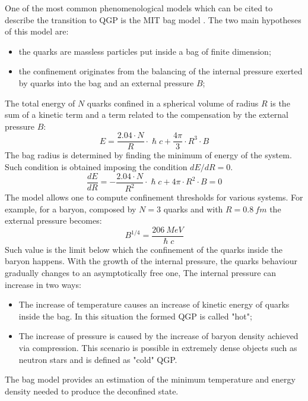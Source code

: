 One of the most common phenomenological models which can be cited to describe the transition to QGP is the MIT bag model \cite{PhysRevD.9.3471,PhysRevD.10.2599}.
The two main hypotheses of this model are:
\begin{itemize}
    \item the quarks are massless particles put inside a bag of finite dimension;
    \item the confinement originates from the balancing of the internal pressure exerted by quarks into the bag and an external pressure $B$;
\end{itemize}
The total energy of $N$ quarks confined in a spherical volume of radius $R$ is the sum of a kinetic term and a term related to the compensation by the external pressure $B$:
\begin{equation}
    E=\frac{2.04\cdot N}{R}\cdot \hslash c + \frac{4\pi}{3}\cdot R^3\cdot B
\end{equation}
The bag radius is determined by finding the minimum of energy of the system.
Such condition is obtained imposing the condition $dE/dR=0$.
\begin{equation}
\frac{dE}{dR}=-\frac{2.04\cdot N}{R^2}\cdot \hslash c + 4\pi\cdot R^2\cdot B = 0
\end{equation}
The model allows one to compute confinement thresholds for various systems.
For example, for a baryon, composed by $N=3$ quarks and with $R=0.8\ fm$ the external pressure becomes:
\begin{equation}
B^{1/4} = \frac{206\ MeV}{\hslash c}
\end{equation}
Such value is the limit below which the confinement of the quarks inside the baryon happens.
With the growth of the internal pressure, the quarks behaviour gradually changes to an asymptotically free one,
The internal pressure can increase in two ways:
\begin{itemize}
\item The increase of temperature causes an increase of kinetic energy of quarks inside the bag. In this situation the formed QGP is called "hot";
\item The increase of pressure is caused by the increase of baryon density achieved via compression. This scenario is possible in extremely dense objects such as neutron stars and is defined as "cold" QGP.
\end{itemize}

The bag model provides an estimation of the minimum temperature and energy density needed to produce the deconfined state.


